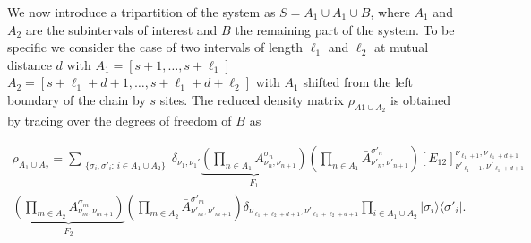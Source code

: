 \documentclass[twocolumn,superscriptaddress,prb,10pt]{revtex4-1}
\begin{document}
We now introduce a tripartition of the system as $S=A_1\cup A_1\cup B$, where $A_1$ and 
$A_2$ are the subintervals of interest and $B$ the remaining part of the system. 
To be specific we consider the case of two intervals of length $\ell_1$ and $\ell_2$ 
at mutual distance $d$ with $A_1=[s+1,\dots,s+\ell_1]$ $A_2=[s+\ell_1+d+1,\dots,s+
\ell_1+d+\ell_2]$ with $A_1$ shifted from the left boundary of the chain by $s$ sites.
The reduced density matrix $\rho_{A1\cup A_2}$ is obtained by tracing over the degrees 
of freedom of $B$ as 
%
%
%
\begin{widetext}
\begin{multline}
\label{rho12}
\rho_{A_1\cup A_2}=\sum\limits_{\substack{\{\sigma_i,\sigma'_{i}:\, i\in A_1\cup A_2\}}}
\delta_{\nu_1,\nu_1'}\underbrace{\left(\prod\limits_{n\in A_1}A^{\sigma_n}_{\nu_{n},\nu_{n+1}}\right)}_{F_1}
\left(\prod_{n\in A_1}\bar A^{\sigma'_n}_{\nu'_{n},\nu'_{n+1}}\right)
[E_{12}]^{\nu_{\ell_1+1},\nu_{\ell_1+d+1}}_{\nu'_{\ell_1+1},\nu'_{\ell_1+d+1}}\\
\underbrace{\left(\prod\limits_{m\in A_2}A^{\sigma_m}_{\nu_{m},\nu_{m+1}}\right)}_{F_2}
\left(\prod_{m\in A_2}\bar A^{\sigma'_m}_{\nu'_{m},\nu'_{m+1}}\right)
\delta_{\nu_{\ell_1+\ell_2+d+1},
\nu'_{\ell_1+\ell_2+d+1}}\prod\limits_{i\in A_1\cup A_2}
|\sigma_i\rangle\langle\sigma'_i|.
\end{multline}
\end{widetext}
%
\end{document}
